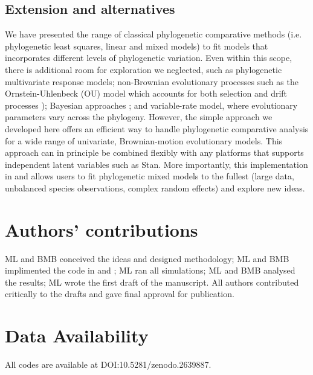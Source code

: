 \documentclass[12pt]{article}
\begin{document}
\subsection*{Extension and alternatives}

We have presented the range of classical phylogenetic comparative methods (i.e. phylogenetic least squares, linear and mixed models) to fit models that incorporates different levels of phylogenetic variation.
Even within this scope, there is additional room for exploration we neglected, such as phylogenetic multivariate response models; non-Brownian evolutionary processes such as the Ornstein-Uhlenbeck (OU) model which accounts for both selection and drift processes \citep{butler2004phylogenetic}); Bayesian approaches \citep{hadfield2010general}; and variable-rate model, where evolutionary parameters vary across the phylogeny.
However, the simple approach we developed here offers an efficient way to handle phylogenetic comparative analysis for a wide range of univariate, Brownian-motion evolutionary models. 
This approach can in principle be combined flexibly with any platforms that supports independent latent variables such as Stan.
More importantly, this implementation in  and  allows users to fit phylogenetic mixed models to the fullest (large data, unbalanced species observations, complex random effects) and explore new ideas.

\section*{Authors’ contributions}

ML and BMB conceived the ideas and designed methodology; ML and BMB implimented the code in  and ; ML ran all simulations; ML and BMB analysed the results; ML wrote the first draft of the manuscript. All authors contributed critically to the drafts and gave final approval for publication.

\section*{Data Availability}

All codes are available at DOI:10.5281/zenodo.2639887.



% 
\end{document}
